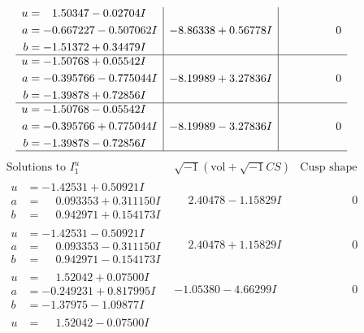 \documentclass[1p]{elsarticle_modified}
\theoremstyle{definition}
\newcommand{\I}{\sqrt{-1}}
\begin{document}
$$\begin{array}{c|c|c}
\begin{aligned}
u &= \phantom{-}1.50347 - 0.02704 I \\
a &= -0.667227 - 0.507062 I \\
b &= -1.51372 + 0.34479 I\end{aligned}
 & -8.86338 + 0.56778 I & \phantom{-0.000000 } 0 \\ \hline\begin{aligned}
u &= -1.50768 + 0.05542 I \\
a &= -0.395766 - 0.775044 I \\
b &= -1.39878 + 0.72856 I\end{aligned}
 & -8.19989 + 3.27836 I & \phantom{-0.000000 } 0 \\ \hline\begin{aligned}
u &= -1.50768 - 0.05542 I \\
a &= -0.395766 + 0.775044 I \\
b &= -1.39878 - 0.72856 I\end{aligned}
 & -8.19989 - 3.27836 I & \phantom{-0.000000 } 0\\
 \hline 
 \end{array}$$\newpage$$\begin{array}{c|c|c}  
\text{Solutions to }I^u_{1}& \I (\text{vol} + \sqrt{-1}CS) & \text{Cusp shape}\\
 \hline 
\begin{aligned}
u &= -1.42531 + 0.50921 I \\
a &= \phantom{-}0.093353 + 0.311150 I \\
b &= \phantom{-}0.942971 + 0.154173 I\end{aligned}
 & \phantom{-}2.40478 - 1.15829 I & \phantom{-0.000000 } 0 \\ \hline\begin{aligned}
u &= -1.42531 - 0.50921 I \\
a &= \phantom{-}0.093353 - 0.311150 I \\
b &= \phantom{-}0.942971 - 0.154173 I\end{aligned}
 & \phantom{-}2.40478 + 1.15829 I & \phantom{-0.000000 } 0 \\ \hline\begin{aligned}
u &= \phantom{-}1.52042 + 0.07500 I \\
a &= -0.249231 + 0.817995 I \\
b &= -1.37975 - 1.09877 I\end{aligned}
 & -1.05380 - 4.66299 I & \phantom{-0.000000 } 0 \\ \hline\begin{aligned}
u &= \phantom{-}1.52042 - 0.07500 I \\

\end{aligned}
\end{array}$$
\end{document}
